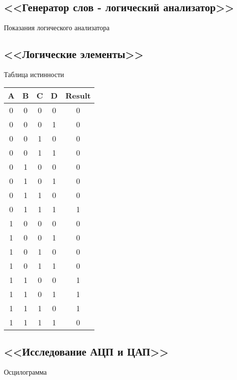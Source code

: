 \documentclass[11pt]{article}
\begin{document}
\subsection{<<Генератор слов - логический анализатор>>}
\begin{center}
    Показания логического анализатора

\end{center}
\subsection{<<Логические элементы>>}
\begin{center}
    Таблица истинности
    \begin{table}[h!]
        \centering
        \begin{tabular}{|c|c|c|c|c|}
            \hline
            A & B & C & D & Result \\ \hline
            0 & 0 & 0 & 0 & 0      \\ \hline
            0 & 0 & 0 & 1 & 0      \\ \hline
            0 & 0 & 1 & 0 & 0      \\ \hline
            0 & 0 & 1 & 1 & 0      \\ \hline
            0 & 1 & 0 & 0 & 0      \\ \hline
            0 & 1 & 0 & 1 & 0      \\ \hline
            0 & 1 & 1 & 0 & 0      \\ \hline
            0 & 1 & 1 & 1 & 1      \\ \hline
            1 & 0 & 0 & 0 & 0      \\ \hline
            1 & 0 & 0 & 1 & 0      \\ \hline
            1 & 0 & 1 & 0 & 0      \\ \hline
            1 & 0 & 1 & 1 & 0      \\ \hline
            1 & 1 & 0 & 0 & 1      \\ \hline
            1 & 1 & 0 & 1 & 1      \\ \hline
            1 & 1 & 1 & 0 & 1      \\ \hline
            1 & 1 & 1 & 1 & 0      \\ \hline
        \end{tabular}
    \end{table}
\end{center}
\subsection{<<Исследование АЦП и ЦАП>>}
\begin{center}
    Осцилограмма

\end{center}
\end{document}
